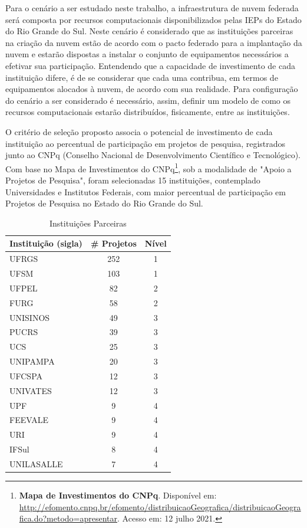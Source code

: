 \documentclass[tese,capa]{texufpel}
\begin{document}
Para o cenário a ser estudado neste trabalho, a infraestrutura de nuvem federada será composta por recursos computacionais disponibilizados pelas IEPs do Estado do Rio Grande do Sul. Neste cenário é considerado que as instituições parceiras na criação da nuvem estão de acordo com o pacto federado para a implantação da nuvem e estarão dispostas a instalar o conjunto de equipamentos necessários a efetivar sua participação. Entendendo que a capacidade de investimento de cada instituição difere, é de se considerar que cada uma contribua, em termos de equipamentos alocados à nuvem, de acordo com sua realidade. Para configuração do cenário a ser considerado é necessário, assim, definir um modelo de como os recursos computacionais estarão distribuídos, fisicamente, entre as instituições. 

O critério de seleção proposto associa o potencial de investimento de cada instituição ao percentual de participação em projetos de pesquisa, registrados junto ao CNPq (Conselho Nacional de Desenvolvimento Científico e Tecnológico). Com base no Mapa de Investimentos do CNPq\footnote{\textbf{Mapa de Investimentos do CNPq}. Disponível em: \url{http://efomento.cnpq.br/efomento/distribuicaoGeografica/distribuicaoGeografica.do?metodo=apresentar}. Acesso em: 12 julho 2021.}, sob a modalidade de "Apoio a Projetos de Pesquisa", foram selecionadas 15 instituições, contemplado Universidades e Institutos Federais, com maior percentual de participação em Projetos de Pesquisa no Estado do Rio Grande do Sul.

\begin{table}[H]
    \centering
    \caption{Instituições Parceiras}
    \label{tab:instpar}
    \begin{tabular}{@{}lcc@{}}
        \toprule
        \textbf{Instituição (sigla)} & \multicolumn{1}{l}{\textbf{\# Projetos}} & \multicolumn{1}{l}{\textbf{Nível}} \\ \midrule
        UFRGS      & 252 & 1 \\
        UFSM       & 103 & 1 \\ \midrule
        UFPEL      & 82  & 2 \\
        FURG       & 58  & 2 \\ \midrule
        UNISINOS   & 49  & 3 \\
        PUCRS      & 39  & 3 \\
        UCS        & 25  & 3 \\
        UNIPAMPA   & 20  & 3 \\
        UFCSPA     & 12  & 3 \\
        UNIVATES   & 12  & 3 \\ \midrule
        UPF        & 9   & 4 \\ 
        FEEVALE    & 9   & 4 \\
        URI        & 9   & 4 \\
        IFSul      & 8   & 4 \\
        UNILASALLE & 7   & 4 \\ \bottomrule
    \end{tabular}
\end{table}
\end{document}
